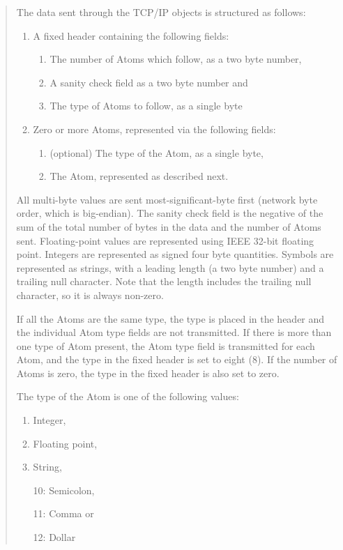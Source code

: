 \begin{quote}
The data sent through the TCP/IP objects is structured as follows:
\begin{enumerate}[ 1)]
\item A fixed header containing the following fields:
\begin{enumerate}[ a)]
\item The number of Atoms which follow, as a two byte number,
\item A sanity check field as a two byte number and
\item The type of Atoms to follow, as a single byte
\end{enumerate}
\item Zero or more Atoms, represented via the following fields:
\begin{enumerate}[ a)]
\item (optional) The type of the Atom, as a single byte,
\item The Atom, represented as described next.
\end{enumerate}
\end{enumerate}
All multi-byte values are sent most-significant-byte first (network byte order, which is big-endian).
The sanity check field is the negative of the sum of the total number of bytes in the data and
the number of Atoms sent.
Floating-point values are represented using IEEE 32-bit floating point.
Integers are represented as signed four byte quantities.
Symbols are represented as strings, with a leading length (a two byte number) and a trailing null
character. Note that the length includes the trailing null character, so it is always non-zero.

If all the Atoms are the same type, the type is placed in the header and the individual Atom type
fields are not transmitted.
If there is more than one type of Atom present, the Atom type field is transmitted for each Atom,
and the type in the fixed header is set to eight (8).
If the number of Atoms is zero, the type in the fixed header is also set to zero.

The type of the Atom is one of the following values:
\begin{enumerate}[ 1:]
\item Integer,
\item Floating point,
\item String,
\item[10:] Semicolon,
\item[11:] Comma or
\item[12:] Dollar
\end{enumerate}


\end{quote}
